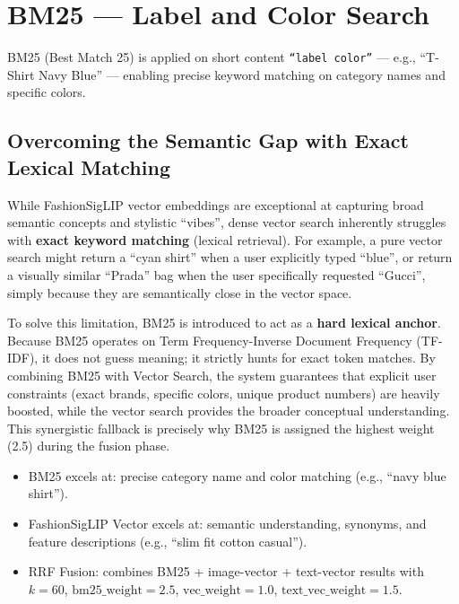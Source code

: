 \section{BM25 --- Label and Color Search}
BM25 (Best Match 25) is applied on short content \texttt{``label color''} --- e.g., ``T-Shirt Navy Blue'' --- enabling precise keyword matching on category names and specific colors.

\subsection{Overcoming the Semantic Gap with Exact Lexical Matching}
While FashionSigLIP vector embeddings are exceptional at capturing broad semantic concepts and stylistic ``vibes'', dense vector search inherently struggles with \textbf{exact keyword matching} (lexical retrieval). For example, a pure vector search might return a ``cyan shirt'' when a user explicitly typed ``blue'', or return a visually similar ``Prada'' bag when the user specifically requested ``Gucci'', simply because they are semantically close in the vector space.

To solve this limitation, BM25 is introduced to act as a \textbf{hard lexical anchor}. Because BM25 operates on Term Frequency-Inverse Document Frequency (TF-IDF), it does not guess meaning; it strictly hunts for exact token matches. By combining BM25 with Vector Search, the system guarantees that explicit user constraints (exact brands, specific colors, unique product numbers) are heavily boosted, while the vector search provides the broader conceptual understanding. This synergistic fallback is precisely why BM25 is assigned the highest weight (2.5) during the fusion phase.

\begin{tcolorbox}[title=Method: Hybrid Search --- BM25 + FashionSigLIP]
\begin{itemize}
    \item BM25 excels at: precise category name and color matching (e.g., ``navy blue shirt'').
    \item FashionSigLIP Vector excels at: semantic understanding, synonyms, and feature descriptions (e.g., ``slim fit cotton casual'').
    \item RRF Fusion: combines BM25 + image-vector + text-vector results with $k = 60$, $\text{bm25\_weight}=2.5$, $\text{vec\_weight}=1.0$, $\text{text\_vec\_weight}=1.5$.
\end{itemize}
\end{tcolorbox}

